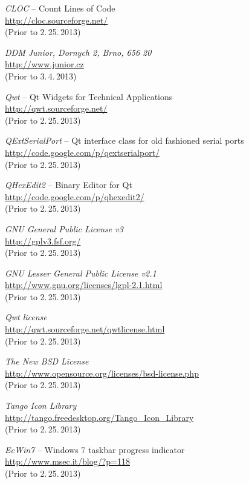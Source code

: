 \documentclass[12pt, a4paper, oneside]{article}
\newcommand{\It}{\textit}  %
\begin{document}
\begin{thebibliography}{99}
     \It{CLOC} -- Count Lines of Code \\
    \url{http://cloc.sourceforge.net/}\\
    (Prior to 2.\,25.\,2013)

     \It{DDM Junior, Dornych 2, Brno, 656 20}\\
    \url{http://www.junior.cz}\\
    (Prior to 3.\,4.\,2013)

     \It{Qwt} -- Qt Widgets for Technical Applications \\
    \url{http://qwt.sourceforge.net/}\\
    (Prior to 2.\,25.\,2013)

     \It{QExtSerialPort} -- Qt interface class for old fashioned serial ports \\
    \url{http://code.google.com/p/qextserialport/}\\
    (Prior to 2.\,25.\,2013)

     \It{QHexEdit2} -- Binary Editor for Qt \\
    \url{http://code.google.com/p/qhexedit2/}\\
    (Prior to 2.\,25.\,2013)

     \It{GNU General Public License v3} \\
    \url{http://gplv3.fsf.org/}\\
    (Prior to 2.\,25.\,2013)

     \It{GNU Lesser General Public License v2.1} \\
    \url{http://www.gnu.org/licenses/lgpl-2.1.html}\\
    (Prior to 2.\,25.\,2013)

     \It{Qwt license} \\
    \url{http://qwt.sourceforge.net/qwtlicense.html}\\
    (Prior to 2.\,25.\,2013)

     \It{The New BSD License} \\
    \url{http://www.opensource.org/licenses/bsd-license.php}\\
    (Prior to 2.\,25.\,2013)

     \It{Tango Icon Library} \\
    \url{http://tango.freedesktop.org/Tango_Icon_Library}\\
    (Prior to 2.\,25.\,2013)

     \It{EcWin7} -- Windows 7 taskbar progress indicator \\
    \url{http://www.msec.it/blog/?p=118}\\
    (Prior to 2.\,25.\,2013)


\end{thebibliography}
\end{document}

